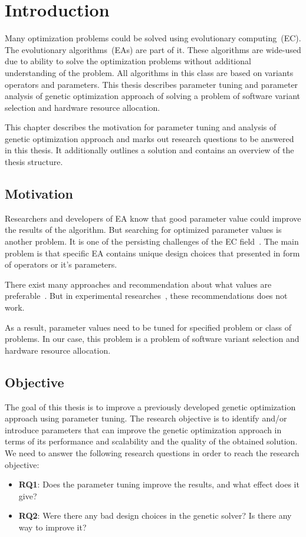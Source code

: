 \chapter{Introduction}\label{intro}

Many optimization problems could be solved using evolutionary computing~(EC). The evolutionary algorithms~(EAs) are part of it. These algorithms are wide-used due to ability to solve the optimization problems without additional understanding of the problem. All algorithms in this class are based on variants operators and parameters. This thesis describes parameter tuning and parameter analysis of genetic optimization approach of solving a problem of software variant selection and hardware resource allocation.  

This chapter describes the motivation for parameter tuning and analysis of genetic optimization approach and marks out research questions to be answered in this thesis. It additionally outlines a solution and contains an overview of the thesis structure.

\section{Motivation}
Researchers and developers of EA know that good parameter value could improve the results of the algorithm. But searching for optimized parameter values is another problem. It is one of the persisting challenges of the EC field~\cite{smit2010parameter}. The main problem is that specific EA contains unique design choices that presented in form of operators or it's parameters. 

There exist many approaches and recommendation about what values are preferable~\cite{de2007parameter, sipper2018investigating}. But in experimental researches~\cite{de2007parameter, shahookar1990genetic, gockel1997influencing}, these recommendations does not work. 

As a result, parameter values need to be tuned for specified problem or class of problems. In our case, this problem is a problem of software variant selection and hardware resource allocation. 


\section{Objective}
The goal of this thesis is to improve a previously developed genetic optimization approach using parameter tuning.
The research objective is to identify and/or introduce parameters that can improve the genetic optimization approach in terms of its performance and scalability and the quality of the obtained solution. We need to answer the following research questions in order to reach the research objective: 
\begin{itemize}
	\item \textbf{RQ1}: Does the parameter tuning improve the results, and what effect does it give?
	\item \textbf{RQ2}: Were there any bad design choices in the genetic solver? Is there any way to improve it?
\end{itemize}

